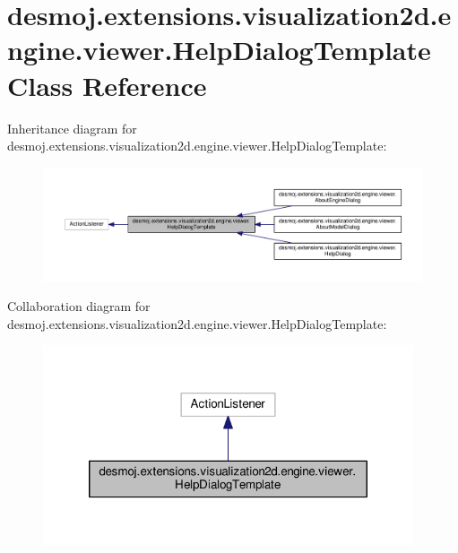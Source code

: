 \section{desmoj.\-extensions.\-visualization2d.\-engine.\-viewer.\-Help\-Dialog\-Template Class Reference}
\label{classdesmoj_1_1extensions_1_1visualization2d_1_1engine_1_1viewer_1_1_help_dialog_template}


Inheritance diagram for desmoj.\-extensions.\-visualization2d.\-engine.\-viewer.\-Help\-Dialog\-Template\-:
\nopagebreak
\begin{figure}[H]
\begin{center}
\leavevmode
\includegraphics[width=350pt]{classdesmoj_1_1extensions_1_1visualization2d_1_1engine_1_1viewer_1_1_help_dialog_template__inherit__graph}
\end{center}
\end{figure}


Collaboration diagram for desmoj.\-extensions.\-visualization2d.\-engine.\-viewer.\-Help\-Dialog\-Template\-:
\nopagebreak
\begin{figure}[H]
\begin{center}
\leavevmode
\includegraphics[width=310pt]{classdesmoj_1_1extensions_1_1visualization2d_1_1engine_1_1viewer_1_1_help_dialog_template__coll__graph}
\end{center}
\end{figure}
